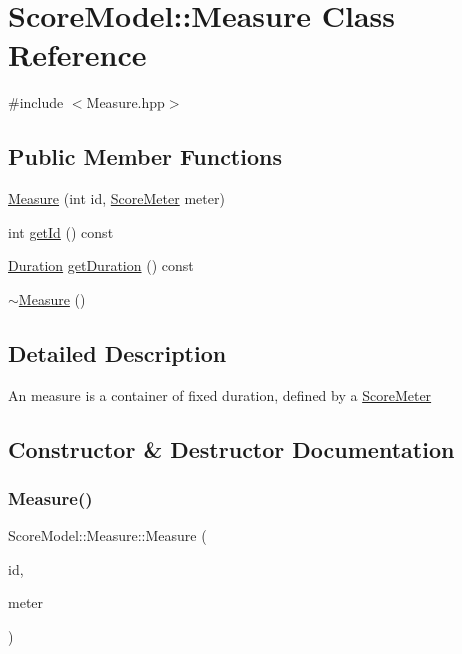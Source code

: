 \hypertarget{classScoreModel_1_1Measure}{}\section{Score\+Model\+::Measure Class Reference}
\label{classScoreModel_1_1Measure}


{\ttfamily \#include $<$Measure.\+hpp$>$}

\subsection*{Public Member Functions}
\begin{DoxyCompactItemize}
\item 
\mbox{\hyperlink{classScoreModel_1_1Measure_acc80eb46b9be44ee951c2bf04e20a9e9}{Measure}} (int id, \mbox{\hyperlink{classScoreModel_1_1ScoreMeter}{Score\+Meter}} meter)
\item 
int \mbox{\hyperlink{classScoreModel_1_1Measure_a659c3c98b641f9cef1f3e99a3a38a502}{get\+Id}} () const
\item 
\mbox{\hyperlink{classScoreModel_1_1Duration}{Duration}} \mbox{\hyperlink{classScoreModel_1_1Measure_abffe1faa56b382dea4a8869cde03e8ba}{get\+Duration}} () const
\item 
\mbox{\hyperlink{classScoreModel_1_1Measure_a6b238b9003746affba14269356f14417}{$\sim$\+Measure}} ()
\end{DoxyCompactItemize}


\subsection{Detailed Description}
An measure is a container of fixed duration, defined by a \mbox{\hyperlink{classScoreModel_1_1ScoreMeter}{Score\+Meter}} 

\subsection{Constructor \& Destructor Documentation}
\mbox{\label{classScoreModel_1_1Measure_acc80eb46b9be44ee951c2bf04e20a9e9}} 
\subsubsection{\texorpdfstring{Measure()}{Measure()}}
{\footnotesize\ttfamily Score\+Model\+::\+Measure\+::\+Measure (\begin{DoxyParamCaption}\item[{int}]{id,  }\item[{\mbox{\hyperlink{classScoreModel_1_1ScoreMeter}{Score\+Meter}}}]{meter }\end{DoxyParamCaption})}

